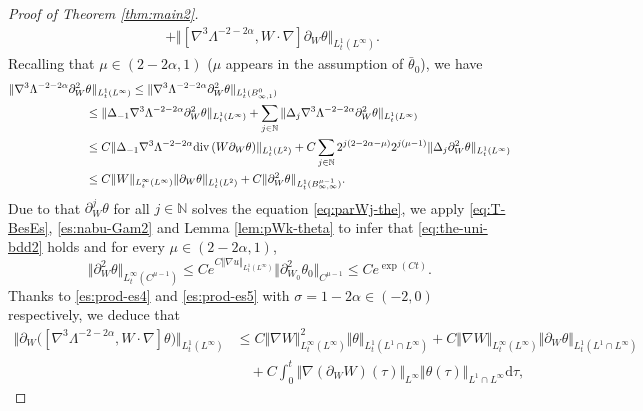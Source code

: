 \documentclass[reqno,11pt,a4paper]{amsart}
\newcommand{\dd}{\mathrm{d}}
\renewcommand{\div}{{\rm div\,}}
\def \p {\partial}
\begin{document}
\begin{proof}[Proof of Theorem \ref{thm:main2}]
\begin{align*}
  &\quad+\Vert [\nabla^3\Lambda^{-2-2\alpha}, W\cdot\nabla]\p_W\theta\Vert _{L_t^1(L^\infty)}.
\end{align*}
Recalling that $\mu\in (2-2\alpha,1)$ ($\mu$ appears in the assumption of $\bar{\theta}_0$), we have
\begin{align*}
  \Vert \nabla^3 \Lambda^{-2-2\alpha} \p^2_W & \theta \Vert _{L^1_t(L^\infty)} 
  \leq \Vert \nabla^3 \Lambda^{-2-2\alpha} \partial_W^2 
  \theta\Vert _{L^1_t(B^0_{\infty,1})} \\
  & \leq \Vert \Delta_{-1}\nabla^3\Lambda^{-2-2\alpha} \p^2_W\theta\Vert _{L^1_t(L^\infty)} 
  + \sum_{j\in\mathbb{N}} \Vert \Delta_j\nabla^3\Lambda^{-2-2\alpha} \p^2_W\theta\Vert _{L^1_t(L^\infty)} \\
  & \leq C\Vert \Delta_{-1}\nabla^3\Lambda^{-2-2\alpha} \div (W\p_W\theta)\Vert _{L^1_t(L^2)} 
  + C\sum\limits_{j\in\mathbb{N}} 2^{j(2-2\alpha - \mu)} 2^{j(\mu-1)} \Vert \Delta_j \p^2_W\theta\Vert _{L^1_t(L^\infty)} \\
  & \leq C\Vert W\Vert _{L^\infty_t(L^\infty)} \Vert \p_W\theta\Vert _{L^1_t(L^2)} 
  + C\Vert \p^2_W\theta\Vert _{L^1_t(B^{\mu-1}_{\infty,\infty})}.
\end{align*}
Due to that $\partial_W^j\theta$ for all $j\in\mathbb{N}$ solves the equation \eqref{eq:parWj-the}, 
we apply \eqref{eq:T-BesEs}, \eqref{es:nabu-Gam2} and Lemma \ref{lem:pWk-theta} 
to infer that \eqref{eq:the-uni-bdd2} holds and for every $\mu\in(2-2\alpha,1)$,
\begin{equation*}
  \Vert \partial_W^2\theta\Vert _{L_t^\infty(C^{\mu-1})}
  \leq Ce^{C\Vert \nabla u\Vert _{L_t^1(L^\infty)}}\Vert \partial_{W_0}^2\theta_0\Vert _{C^{\mu-1}}\leq Ce^{\exp (Ct)}.
\end{equation*}
Thanks to \eqref{es:prod-es4} and \eqref{es:prod-es5} with $\sigma =1-2\alpha \in (-2, 0)$ respectively, we deduce that
\begin{align*}
  \big\Vert \p_W\big([\nabla^3\Lambda^{-2-2\alpha}, W\cdot\nabla]\theta\big)\big\Vert _{L^1_t(L^\infty)} 
  &\leq C \Vert \nabla W\Vert _{L^\infty_t(L^\infty)}^2 \Vert \theta\Vert _{L^1_t(L^1\cap L^\infty)}   
  + C \Vert \nabla W\Vert _{L^\infty_t(L^\infty)} \Vert \partial_W\theta\Vert _{L^1_t(L^1\cap L^\infty)} \\
  & \quad + C \int_0^t \Vert \nabla (\partial_W W)(\tau)\Vert _{L^\infty} \Vert \theta(\tau)\Vert _{L^1\cap L^\infty} \dd \tau ,

\end{align*}
\end{proof}
\end{document}
